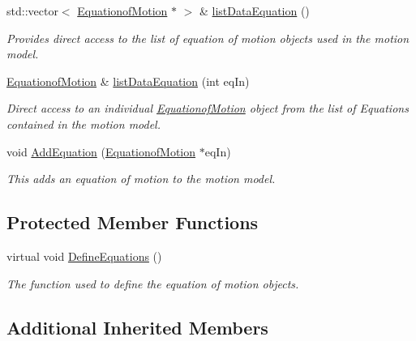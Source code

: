 \begin{DoxyCompactItemize}
std\-::vector$<$ \hyperlink{classosea_1_1ofreq_1_1_equationof_motion}{Equationof\-Motion} $\ast$ $>$ \& \hyperlink{classosea_1_1ofreq_1_1_motion_model_a644171d63e9dba6a0b1ec57be33653f7}{list\-Data\-Equation} ()
\begin{DoxyCompactList}\small\item\em Provides direct access to the list of equation of motion objects used in the motion model. \end{DoxyCompactList}\item 
\hyperlink{classosea_1_1ofreq_1_1_equationof_motion}{Equationof\-Motion} \& \hyperlink{classosea_1_1ofreq_1_1_motion_model_a485a85942201e939102865f8923d9a51}{list\-Data\-Equation} (int eq\-In)
\begin{DoxyCompactList}\small\item\em Direct access to an individual \hyperlink{classosea_1_1ofreq_1_1_equationof_motion}{Equationof\-Motion} object from the list of Equations contained in the motion model. \end{DoxyCompactList}\item 
void \hyperlink{classosea_1_1ofreq_1_1_motion_model_a73489d88c07b26109bbb9bdd0a576b30}{Add\-Equation} (\hyperlink{classosea_1_1ofreq_1_1_equationof_motion}{Equationof\-Motion} $\ast$eq\-In)
\begin{DoxyCompactList}\small\item\em This adds an equation of motion to the motion model. \end{DoxyCompactList}\end{DoxyCompactItemize}
\subsection*{Protected Member Functions}
\begin{DoxyCompactItemize}
\item 
virtual void \hyperlink{classosea_1_1ofreq_1_1_motion_model_a001b525e45be6f6c8f9088dacbb161c6}{Define\-Equations} ()
\begin{DoxyCompactList}\small\item\em The function used to define the equation of motion objects. \end{DoxyCompactList}\end{DoxyCompactItemize}
\subsection*{Additional Inherited Members}


